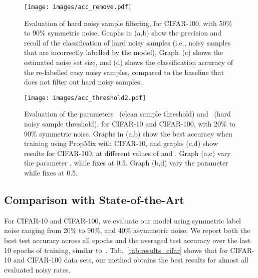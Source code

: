 \documentclass{bmvc2k}
\begin{document}
 


\begin{figure}[!ht]
\centering
\texttt{[image: images/acc\_remove.pdf]}
\caption{Evaluation of hard noisy sample filtering, for CIFAR-100, with 50\% to 90\% symmetric noise. Graphs in (a,b) show the precision and recall of the classification of hard noisy samples (i.e., noisy samples that are incorrectly labelled by the model), Graph~(c) shows the estimated noise set size, and (d) shows the classification accuracy of the re-labelled easy noisy samples, compared to the baseline that does not filter out hard noisy samples.}
\label{fig:noisy_pred}
\end{figure}






\begin{figure}[!ht]
\centering
\texttt{[image: images/acc\_threshold2.pdf]}
\caption{Evaluation of the parameters ~(clean sample threshold) and ~(hard noisy sample threshold), for CIFAR-10 and CIFAR-100, with 20\% to 90\% symmetric noise. Graphs in (a,b) show the best accuracy when training using PropMix with CIFAR-10, and graphs (c,d) show results for CIFAR-100, at different values of  and . Graph (a,c) vary the parameter , while fixes  at 0.5. Graph (b,d) vary the parameter  while fixes  at 0.5.}
\label{fig:th}
\end{figure}

\vspace{-.1in}
\subsection{Comparison with State-of-the-Art}

For CIFAR-10 and CIFAR-100, we evaluate our model using symmetric label noise ranging from 20\% to 90\%, and 40\% asymmetric noise. 
We report both the best test accuracy across all epochs and the averaged test accuracy over the last 10 epochs of training, similar to~\citep{DivideMix}. Tab.~\ref{tab:results_cifar} shows that for CIFAR-10 and CIFAR-100 data sets, our method obtains the best results for almost all evaluated noisy rates.
\end{document}
